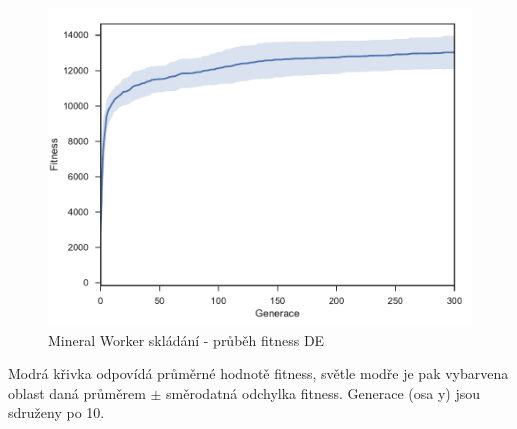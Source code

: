 \clearpage
\begin{figure}[t]\centering
	\includegraphics[width=\columnwidth]{../img/MineralMap/MineralWorkerPickup}
	\caption{Mineral Worker skládání -  průběh fitness DE}
	\label{obr04:MineralWorkerStore}
\end{figure}
Modrá křivka odpovídá průměrné hodnotě fitness, světle modře je pak vybarvena oblast daná průměrem $\pm$ směrodatná odchylka fitness. Generace (osa y) jsou sdruženy po 10. 
\clearpage

